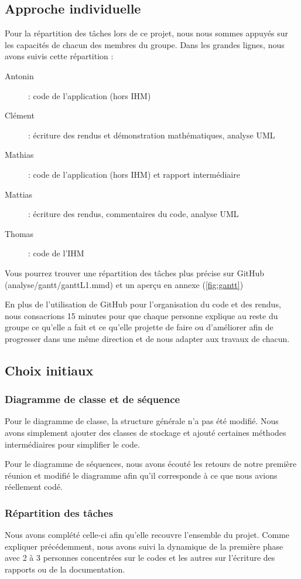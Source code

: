 \subsection{Approche individuelle}
Pour la répartition des tâches lors de ce projet, nous nous sommes appuyés sur les capacités de chacun des membres du groupe. Dans les grandes lignes, nous avons suivis cette répartition :
\begin{description}
    \item[Antonin] : code de l’application (hors IHM) 
    \item[Clément] : écriture des rendus et démonstration mathématiques, analyse UML
    \item[Mathias] : code de l'application (hors IHM) et rapport intermédiaire
    \item[Mattias] : écriture des rendus, commentaires du code, analyse UML
    \item[Thomas] : code de l'IHM 
\end{description}
Vous pourrez trouver une répartition des tâches plus précise sur GitHub (analyse/gantt/ganttL1.mmd) et un aperçu en annexe (\ref{fig:gantt})\par
En plus de l'utilisation de GitHub pour l'organisation du code et des rendus, nous consacrions 15 minutes pour que chaque personne explique au reste du groupe ce qu'elle a fait et ce qu'elle projette de faire ou d'améliorer afin de progresser dans une même direction et de nous adapter aux travaux de chacun.\par  


\subsection{Choix initiaux}
\subsubsection{Diagramme de classe et de séquence}
Pour le diagramme de classe, la structure générale n'a pas été modifié. Nous avons simplement ajouter des classes de stockage et ajouté certaines méthodes intermédiaires pour simplifier le code.\par
Pour le diagramme de séquences, nous avons écouté les retours de notre première réunion et modifié le diagramme afin qu'il corresponde à ce que nous avions réellement codé.
\subsubsection{Répartition des tâches}
Nous avons complété celle-ci afin qu'elle recouvre l'ensemble du projet. Comme expliquer précédemment, nous avons suivi la dynamique de la première phase avec 2 à 3 personnes concentrées sur le codes et les autres sur l'écriture des rapports ou de la documentation. 